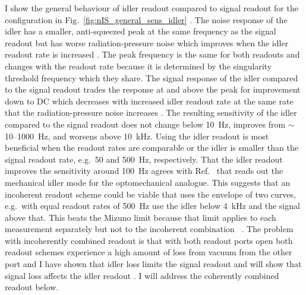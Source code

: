I show the general behaviour of idler readout compared to signal readout for the configuration in Fig.~\ref{fig:nIS_general_sens_idler} . The noise response of the idler has a smaller, anti-squeezed peak at the same frequency  as the signal readout but has worse radiation-pressure noise which improves when the idler readout rate is increased . The peak frequency is the same for both readouts and changes with the readout rate because it is determined by the singularity threshold frequency which they share. The signal response of the idler compared to the signal readout trades the response at and above the peak for improvement down to DC which decreases with increased idler readout rate at the same rate that the radiation-pressure noise increases .
The resulting sensitivity of the idler compared to the signal readout does not change below 10~Hz, improves from $\sim$10--1000~Hz, and worsens above 10~kHz. Using the idler readout is most beneficial when the readout rates are comparable or the idler is smaller than the signal readout rate, e.g.\ 50 and 500~Hz, respectively. 
That the idler readout improves the sensitivity around 100~Hz agrees with Ref.~\cite{Li2021} that reads out the mechanical idler mode for the optomechanical analogue.
This suggests that an incoherent readout scheme could be viable that uses the envelope of two curves, e.g.\ with equal readout rates of 500~Hz use the idler below 4~kHz and the signal above that. This beats the Mizuno limit because that limit applies to each measurement separately but not to the incoherent combination ~\cite{}. The problem with incoherently combined readout is that with both readout ports open both readout schemes experience a high amount of loss from vacuum from the other port and I have shown that idler loss limits the signal readout and will show that signal loss affects the idler readout . I will address the coherently combined readout below.

